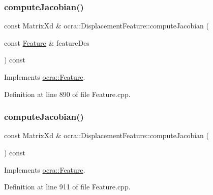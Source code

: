 \subsubsection{\texorpdfstring{compute\+Jacobian()}{computeJacobian()}\hspace{0.1cm}{\footnotesize\ttfamily [1/2]}}
{\footnotesize\ttfamily const Matrix\+Xd \& ocra\+::\+Displacement\+Feature\+::compute\+Jacobian (\begin{DoxyParamCaption}\item[{const \hyperlink{classocra_1_1Feature}{Feature} \&}]{feature\+Des }\end{DoxyParamCaption}) const\hspace{0.3cm}{\ttfamily [virtual]}}



Implements \hyperlink{classocra_1_1Feature_a4fb8eeeed978a1f727ec43cd1bd18d78}{ocra\+::\+Feature}.



Definition at line 890 of file Feature.\+cpp.

\hypertarget{classocra_1_1DisplacementFeature_a87e2abee5d1072e142dcab99193699da}{}\label{classocra_1_1DisplacementFeature_a87e2abee5d1072e142dcab99193699da} 
\subsubsection{\texorpdfstring{compute\+Jacobian()}{computeJacobian()}\hspace{0.1cm}{\footnotesize\ttfamily [2/2]}}
{\footnotesize\ttfamily const Matrix\+Xd \& ocra\+::\+Displacement\+Feature\+::compute\+Jacobian (\begin{DoxyParamCaption}{ }\end{DoxyParamCaption}) const\hspace{0.3cm}{\ttfamily [virtual]}}



Implements \hyperlink{classocra_1_1Feature_adbab3b388657555abb805bb971c2491f}{ocra\+::\+Feature}.



Definition at line 911 of file Feature.\+cpp.

\hypertarget{classocra_1_1DisplacementFeature_a3c72ecae0cb33a812c66b0770baf09bf}{}\label{classocra_1_1DisplacementFeature_a3c72ecae0cb33a812c66b0770baf09bf} 
